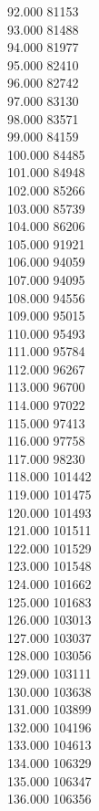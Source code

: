 { 92.000	81153 \\
 93.000	81488 \\
 94.000	81977 \\
 95.000	82410 \\
 96.000	82742 \\
 97.000	83130 \\
 98.000	83571 \\
 99.000	84159 \\
 100.000	84485 \\
 101.000	84948 \\
 102.000	85266 \\
 103.000	85739 \\
 104.000	86206 \\
 105.000	91921 \\
 106.000	94059 \\
 107.000	94095 \\
 108.000	94556 \\
 109.000	95015 \\
 110.000	95493 \\
 111.000	95784 \\
 112.000	96267 \\
 113.000	96700 \\
 114.000	97022 \\
 115.000	97413 \\
 116.000	97758 \\
 117.000	98230 \\
 118.000	101442 \\
 119.000	101475 \\
 120.000	101493 \\
 121.000	101511 \\
 122.000	101529 \\
 123.000	101548 \\
 124.000	101662 \\
 125.000	101683 \\
 126.000	103013 \\
 127.000	103037 \\
 128.000	103056 \\
 129.000	103111 \\
 130.000	103638 \\
 131.000	103899 \\
 132.000	104196 \\
 133.000	104613 \\
 134.000	106329 \\
 135.000	106347 \\
 136.000	106356 \\
}
